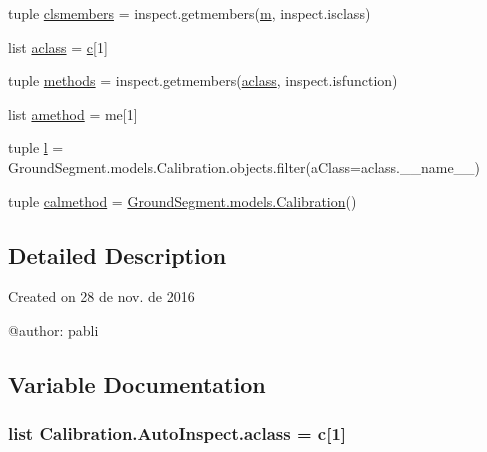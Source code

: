 \begin{DoxyCompactItemize}
tuple \hyperlink{namespace_calibration_1_1_auto_inspect_ab0e7aff2928c6e30e46fe2b763c20140}{clsmembers} = inspect.\+getmembers(\hyperlink{namespace_calibration_1_1_auto_inspect_a49668bb1b794ae779ef7026664839469}{m}, inspect.\+isclass)
\item 
list \hyperlink{namespace_calibration_1_1_auto_inspect_a78ac735abaf44b22e2f3790a7e063a1c}{aclass} = \hyperlink{bootstrap_8min_8js_ad9d1ac02e33c4aed62ad517a7cb8b3fb}{c}\mbox{[}1\mbox{]}
\item 
tuple \hyperlink{namespace_calibration_1_1_auto_inspect_af9c9d86c501c1b59576a64b1576b4a33}{methods} = inspect.\+getmembers(\hyperlink{namespace_calibration_1_1_auto_inspect_a78ac735abaf44b22e2f3790a7e063a1c}{aclass}, inspect.\+isfunction)
\item 
list \hyperlink{namespace_calibration_1_1_auto_inspect_ae31c8304ffa191d79596a071c8d696c5}{amethod} = me\mbox{[}1\mbox{]}
\item 
tuple \hyperlink{namespace_calibration_1_1_auto_inspect_ade7796f10954ce2cb1d47e3c4721a4fd}{l} = Ground\+Segment.\+models.\+Calibration.\+objects.\+filter(a\+Class=aclass.\+\_\+\+\_\+name\+\_\+\+\_\+)
\item 
tuple \hyperlink{namespace_calibration_1_1_auto_inspect_acd12afb52c4a138c629f23aa79874db9}{calmethod} = \hyperlink{class_ground_segment_1_1models_1_1_calibration_1_1_calibration}{Ground\+Segment.\+models.\+Calibration}()
\end{DoxyCompactItemize}


\subsection{Detailed Description}
\begin{DoxyVerb}Created on 28 de nov. de 2016

@author: pabli
\end{DoxyVerb}
 

\subsection{Variable Documentation}
\hypertarget{namespace_calibration_1_1_auto_inspect_a78ac735abaf44b22e2f3790a7e063a1c}{}
\subsubsection[{aclass}]{\setlength{\rightskip}{0pt plus 5cm}list Calibration.\+Auto\+Inspect.\+aclass = {\bf c}\mbox{[}1\mbox{]}}\label{namespace_calibration_1_1_auto_inspect_a78ac735abaf44b22e2f3790a7e063a1c}


